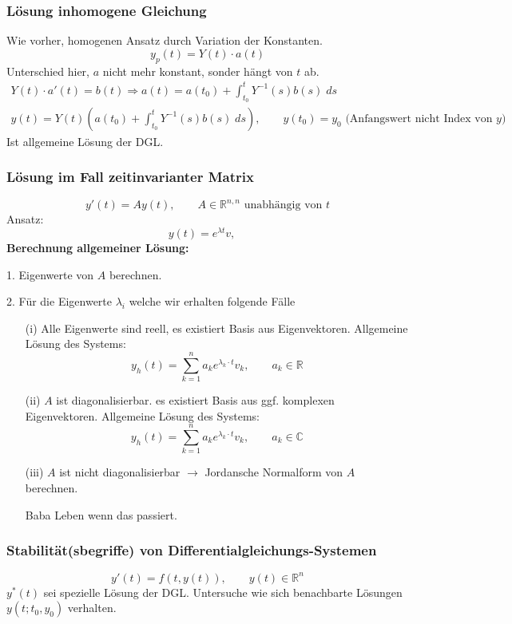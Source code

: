 \documentclass[a4paper]{article}
\newcommand{\R}{\mathbb{R}}
\begin{document}
\subsubsection{Lösung inhomogene Gleichung}
Wie vorher, homogenen Ansatz durch Variation der Konstanten.
\[
	y_p (t) = Y(t) \cdot a(t)
\]
Unterschied hier, $a$ nicht mehr konstant, sonder hängt von $t$ ab.
\begin{gather*}
	Y(t) \cdot a' (t) = b(t)
	\Rightarrow a(t) = a(t_0) +
	\int_{t_0}^{t} Y ^{-1}  (s) b(s) \; ds \\
	y(t) = Y(t) \left(
		a(t_0) + 
		\int_{t_0}^{t} Y ^{-1}  (s) b(s) \; ds
	\right), \qquad
	y(t_0) = y_0
	\text{ (Anfangswert nicht Index von $y$) }
\end{gather*}
Ist allgemeine Lösung der DGL.

\subsubsection{Lösung im Fall zeitinvarianter Matrix}
\[
	y'(t) = A y(t), \qquad
	A \in \R ^{n,n} \text{ unabhängig von $t$}
\]
Ansatz:
\[
	y(t) = e ^{\lambda t} v, \quad
\] 
\textbf{Berechnung allgemeiner Lösung:} 

1. Eigenwerte von $A$ berechnen.

2. Für die Eigenwerte $\lambda_i$ welche wir erhalten folgende
Fälle 

\begin{enumerate}
	\item[(i)] Alle Eigenwerte sind reell,
		es existiert Basis aus Eigenvektoren. Allgemeine
		Lösung des Systems:
		\[
			y_h (t) = \sum_{k=1}^{n} a_k e ^{\lambda_k \cdot t}
			v_k, \qquad
			a_k \in \R
		\] 
	\item[(ii)] $A$ ist diagonalisierbar.
		es existiert Basis aus ggf. komplexen Eigenvektoren. Allgemeine
		Lösung des Systems:
		\[
			y_h (t) = \sum_{k=1}^{n} a_k e ^{\lambda_k \cdot t}
			v_k, \qquad
			a_k \in \mathbb{C}
		\] 
	\item[(iii)] $A$ ist nicht diagonalisierbar
		$\rightarrow$ Jordansche Normalform von $A$ berechnen.

		Baba Leben wenn das passiert.
\end{enumerate}

\subsubsection{Stabilität(sbegriffe) von Differentialgleichungs-Systemen}
\[
	y' (t) = f (t, y(t)), \qquad
	y(t) \in \R ^{n}
\] 
$y^{*} (t)$ sei spezielle Lösung der DGL.
Untersuche wie sich benachbarte Lösungen $y(t; t_0, y_0)$
verhalten.
\\
\end{document}
